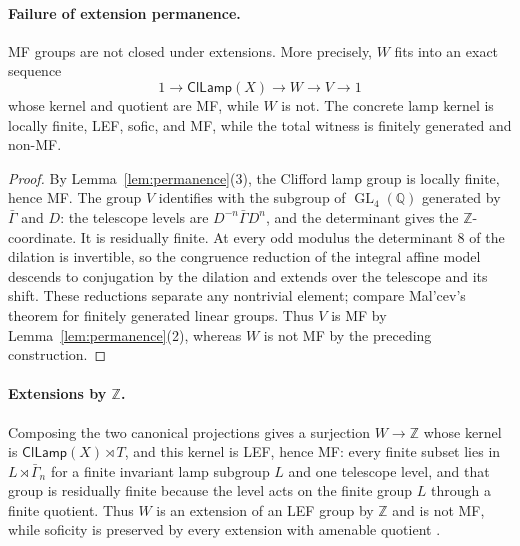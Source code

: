 \documentclass[11pt]{amsart}
\newcommand{\leanverified}[2]{\ignorespaces}
\theoremstyle{definition}
\theoremstyle{remark}
\theoremstyle{plain}
\newcommand{\Z}{\mathbb Z}
\newcommand{\GL}{\operatorname{GL}}
\newcommand{\ClLamp}{\mathsf{ClLamp}}
\begin{document}
\paragraph{Failure of extension permanence.}
MF groups are not closed under extensions.  More precisely, $W$ fits into
an exact sequence
\[
 1\longrightarrow\ClLamp(X)\longrightarrow W\longrightarrow V
 \longrightarrow1
\]
whose kernel and quotient are MF, while $W$ is not.
The concrete lamp kernel is locally finite, LEF, sofic, and MF, while the
total witness is finitely generated and non-MF.
\leanverified{Sofic/LiteralWitnessConsequences}{GroupApproximation.LiteralWitnessConsequences.literalWitness_locallyFiniteKernel_nonMF}

\begin{proof}
By Lemma~\ref{lem:permanence}(3), the Clifford lamp group is locally
finite, hence MF\@.  The group $V$ identifies with the subgroup of
$\GL_4(\mathbb Q)$ generated by $\bar\Gamma$ and $D$: the telescope
levels are $D^{-n}\bar\Gamma D^{n}$, and the determinant gives the
$\mathbb Z$-coordinate.  It is residually finite.  At every odd
modulus the determinant $8$ of the dilation is invertible, so the
congruence reduction of the integral affine model descends to
conjugation by the dilation and extends over the telescope and its
shift.  These reductions separate any nontrivial element; compare
Mal'cev's theorem \cite{Malcev} for finitely generated linear groups.  Thus $V$ is MF by Lemma~\ref{lem:permanence}(2),
whereas $W$ is not MF by the preceding construction.
\end{proof}

\paragraph{Extensions by $\Z$.}
Composing the two
canonical projections gives a surjection $W\to\Z$ whose kernel is
$\ClLamp(X)\rtimes T$, and this kernel is LEF, hence MF: every finite
subset lies in $L\rtimes\bar\Gamma_n$ for a finite invariant lamp
subgroup $L$ and one telescope level, and that group is residually
finite because the level acts on the finite group $L$ through a finite
quotient.  Thus $W$ is an extension of an LEF group by $\Z$ and is not
MF, while soficity is preserved by every extension with amenable
quotient \cite{ElekSzabo}.
\leanverified{Sofic/LEFMarkedCompression}{GroupApproximation.LiteralLEFExtension.literalWitness_LEFKernel_integerExtension_nonMF}
\end{document}
